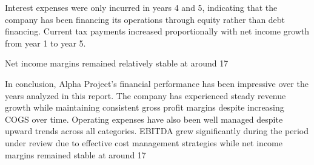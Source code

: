 Interest expenses were only incurred in years 4 and 5, indicating that the company has been financing its operations through equity rather than debt financing. Current tax payments increased proportionally with net income growth from year 1 to year 5.

Net income margins remained relatively stable at around 17%

In conclusion, Alpha Project's financial performance has been impressive over the years analyzed in this report. The company has experienced steady revenue growth while maintaining consistent gross profit margins despite increasing COGS over time. Operating expenses have also been well managed despite upward trends across all categories. EBITDA grew significantly during the period under review due to effective cost management strategies while net income margins remained stable at around 17%
